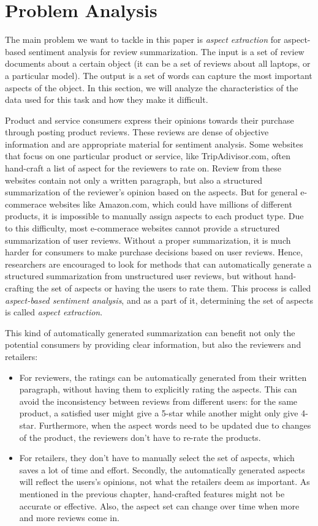 \chapter{Problem Analysis}
\label{chapter:problem}

The main problem we want to tackle in this paper is \emph{aspect extraction} for aspect-based sentiment analysis for review summarization. The input is a set of review documents about a certain object (it can be a set of reviews about all laptops, or a particular model). The output is a set of words can capture the most important aspects of the object. In this section, we will analyze the characteristics of the data used for this task and how they make it difficult.

Product and service consumers express their opinions towards their purchase through posting product reviews. These reviews are dense of objective information and are appropriate material for sentiment analysis. Some websites that focus on one particular product or service, like TripAdivisor.com, often hand-craft a list of aspect for the reviewers to rate on. Review from these websites contain not only a written paragraph, but also a structured summarization of the reviewer's opinion based on the aspects. But for general e-commerace websites like Amazon.com, which could have millions of different products, it is impossible to manually assign aspects to each product type. Due to this difficulty, most e-commerace websites cannot provide a structured summarization of user reviews. Without a proper summarization, it is much harder for consumers to make purchase decisions based on user reviews. Hence, researchers are encouraged to look for methods that can automatically generate a structured summarization from unstructured user reviews, but without hand-crafting the set of aspects or having the users to rate them. This process is called \emph{aspect-based sentiment analysis}, and as a part of it, determining the set of aspects is called \emph{aspect extraction}.

This kind of automatically generated summarization can benefit not only the potential consumers by providing clear information, but also the reviewers and retailers:

\begin{itemize}
    \item For reviewers, the ratings can be automatically generated from their written paragraph, without having them to explicitly rating the aspects. This can avoid the inconsistency between reviews from different users: for the same product, a satisfied user might give a 5-star while another might only give 4-star. Furthermore, when the aspect words need to be updated due to changes of the product, the reviewers don't have to re-rate the products.
    \item For retailers, they don't have to manually select the set of aspects, which saves a lot of time and effort. Secondly, the automatically generated aspects will reflect the users's opinions, not what the retailers deem as important. As mentioned in the previous chapter, hand-crafted features might not be accurate or effective. Also, the aspect set can change over time when more and more reviews come in.
\end{itemize}

